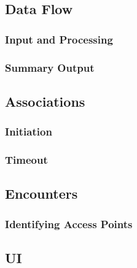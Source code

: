 \subsection{Data Flow}

\subsubsection{Input and Processing}

\subsubsection{Summary Output}

\subsection{Associations} 

\subsubsection{Initiation} 

\subsubsection{Timeout} 

\subsection{Encounters} 
\subsubsection{Identifying Access Points}

\subsection{UI} %
